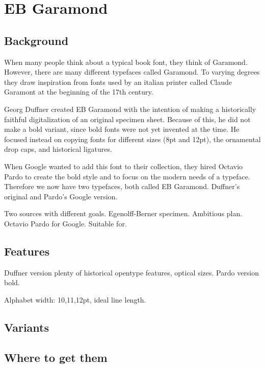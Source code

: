 \switchtobodyfont[duffnerebgaramond,10pt]
\chapter{EB Garamond}

\section{Background}
When many people think about a typical book font, they think of Garamond. However, there are many different typefaces called Garamond. To varying degrees they draw inspiration from fonts used by an italian printer called Claude Garamont at the beginning of the 17th century. 

Georg Duffner created EB Garamond with the intention of making a historically faithful digitalization of an original specimen sheet. Because of this, he did not make a bold variant, since bold fonts were not yet invented at the time. He focused instead on copying fonts for different sizes (8pt and 12pt), the ornamental drop caps, and historical ligatures. 

When Google wanted to add this font to their collection, they hired Octavio Pardo to create the bold style and to focus on the modern needs of a typeface. Therefore we now have two typefaces, both called EB Garamond. Duffner’s original and Pardo’s Google version. 

Two sources with different goals. Egenolff-Berner specimen. Ambitious plan. Octavio Pardo for Google. Suitable for.


\section{Features}
Duffner version plenty of historical opentype features, optical sizes. Pardo version bold.

Alphabet width: 10,11,12pt, ideal line length.

\section{Variants}

\section{Where to get them}


